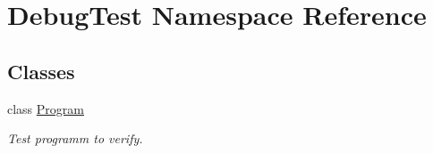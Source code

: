 \hypertarget{namespace_debug_test}{}\section{Debug\+Test Namespace Reference}
\label{namespace_debug_test}
\subsection*{Classes}
\begin{DoxyCompactItemize}
\item 
class \mbox{\hyperlink{class_debug_test_1_1_program}{Program}}
\begin{DoxyCompactList}\small\item\em Test programm to verify. \end{DoxyCompactList}\end{DoxyCompactItemize}
